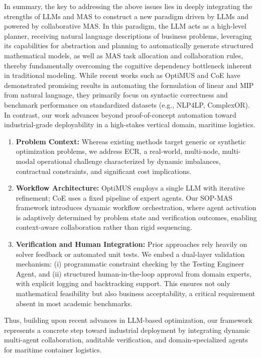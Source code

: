 \documentclass[preprint,12pt]{elsarticle}
\begin{document}
In summary, the key to addressing the above issues lies in deeply integrating the strengths of LLMs and MAS to construct a new paradigm driven by LLMs and powered by collaborative MAS. In this paradigm, the LLM acts as a high-level planner, receiving natural language descriptions of business problems, leveraging its capabilities for abstraction and planning to automatically generate structured mathematical models, as well as MAS task allocation and collaboration rules, thereby fundamentally overcoming the cognitive dependency bottleneck inherent in traditional modeling. While recent works such as OptiMUS \citep{ahmaditeshniziOptiMUSScalableOptimization2024b} and CoE \citep{xiaoChainofExpertsWhenLLMs2023} have demonstrated promising results in automating the formulation of linear and MIP from natural language, they primarily focus on syntactic correctness and benchmark performance on standardized datasets (e.g., NLP4LP, ComplexOR). In contrast, our work advances beyond proof-of-concept automation toward industrial-grade deployability in a high-stakes vertical domain, maritime logistics.
\begin{enumerate}[label=\arabic*)]

\item \textbf{Problem Context:} Whereas existing methods target generic or synthetic optimization problems, we address ECR, a real-world, multi-node, multi-modal operational challenge characterized by dynamic imbalances, contractual constraints, and significant cost implications.
\item \textbf{Workflow Architecture:} OptiMUS employs a single LLM with iterative refinement; CoE uses a fixed pipeline of expert agents. Our SOP-MAS framework introduces dynamic workflow orchestration, where agent activation is adaptively determined by problem state and verification outcomes, enabling context-aware collaboration rather than rigid sequencing.
\item \textbf{Verification and Human Integration:} Prior approaches rely heavily on solver feedback or automated unit tests. We embed a dual-layer validation mechanism: (i) programmatic constraint checking by the Testing Engineer Agent, and (ii) structured human-in-the-loop approval from domain experts, with explicit logging and backtracking support. This ensures not only mathematical feasibility but also business acceptability, a critical requirement absent in most academic benchmarks.
\end{enumerate}
Thus, building upon recent advances in LLM-based optimization, our framework represents a concrete step toward industrial deployment by integrating dynamic multi-agent collaboration, auditable verification, and domain-specialized agents for maritime container logistics.
\end{document}
